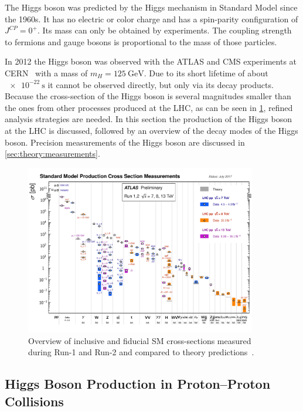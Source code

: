The Higgs boson was predicted by the Higgs mechanism in Standard Model since the 1960s.
It has no electric or color charge and has a spin-parity configuration of $J^{CP} = 0^+$.
Its mass can only be obtained by experiments.
The coupling strength to fermions and gauge bosons is proportional to the mass of those particles.

In 2012 the Higgs boson was observed with the ATLAS and CMS experiments at CERN~\cite{HiggsDiscoveryATLAS,HiggsDiscoveryCMS} with a
mass of $m_H = \SI{125}{\GeV}$.
Due to its short lifetime of about $\SI{e-22}{\s}$ it cannot be observed directly, but only via its decay products.
Because the cross-section of the Higgs boson is several magnitudes smaller than the ones from other processes produced at the LHC,
as can be seen in \cref{fig:theory:higgs:smxsec}, refined analysis strategies are needed.
In this section the production of the Higgs boson at the LHC is discussed, followed by an overview of the decay modes of the Higgs boson.
Precision measurements of the Higgs boson are discussed in \cref{sec:theory:measurements}.

\begin{figure}[htb]
    \centering
    \includegraphics[width=0.9\textwidth]{./figures/theory/sm_xsec.eps}
    \caption{Overview of inclusive and fiducial SM cross-sections measured during Run-1 and Run-2 and compared to theory predictions~\cite{SMPublicResults}.}\label{fig:theory:higgs:smxsec}
\end{figure}

\subsection{Higgs Boson Production in Proton--Proton Collisions}\label{sub:theory:higgs:production}


